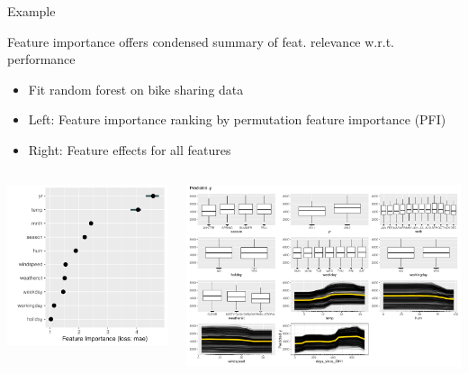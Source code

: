 \documentclass[10pt,compress,t,notes=noshow, xcolor=table]{beamer}
\begin{document}
\begin{frame}{Example}

Feature importance offers condensed summary of feat. relevance w.r.t. performance

\medskip

\begin{itemize}
    \item Fit random forest on bike sharing data
    \item Left: Feature importance ranking by permutation feature importance (PFI)
    \item Right: Feature effects for all features
\end{itemize}

\centering
\begin{columns}[c, totalwidth=\textwidth]
  \begin{column}{0.37\textwidth}
\includegraphics[width=.98\linewidth]{figure_man/bike_pfi}
\end{column}
  \begin{column}{0.63\textwidth}
  \includegraphics[width=\linewidth]{figure_man/bike_pdp+ice}

\end{column}
\end{columns}
\end{frame}
\end{document}
